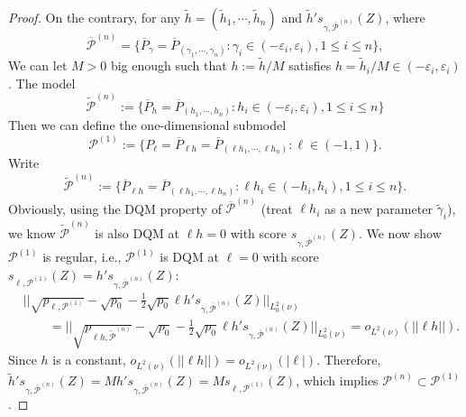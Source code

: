 \documentclass[12pt]{article}
\renewcommand{\(}{\left(}%
\renewcommand{\)}{\right)}%
\renewcommand{\[}{\left[}%
\renewcommand{\]}{\right]}%
\newcommand{\cp}{\mathcal{P}}
\newtheorem{proof}{Proof.}}
\begin{document}
\begin{proof}
	On the contrary, for any $\widetilde{h}=(\widetilde{h}_1,\cdots,\widetilde{h}_n)$ and $\widetilde{h}'s_{\gamma,\overline{\cp}^{(n)}}(Z)$, where
	\begin{equation*}
		\overline{\cp}^{(n)}=\{\overline{P}_{\gamma}=\overline{P}_{(\gamma_1,\cdots,\gamma_n)}:\gamma_i\in(-\varepsilon_i,\varepsilon_i),1\leq i\leq n\},
	\end{equation*}
	We can let $M>0$ big enough such that $h:=\widetilde{h}/M$ satisfies $h=\widetilde{h}_i/M\in (-\varepsilon_i,\varepsilon_i)$. The model
	\begin{equation*}
		\widetilde{\cp}^{(n)}:=\{\overline{P}_{h}=\overline{P}_{(h_1,\cdots,h_n)}:h_i\in(-\varepsilon_i,\varepsilon_i),1\leq i\leq n\}
	\end{equation*}
	Then
	we can define the one-dimensional submodel
	\begin{equation*}
		\cp^{(1)}:=\{P_\ell=\overline{P}_{\ell h}=\overline{P}_{(\ell h_1,\cdots,\ell h_n)}:\ell\in (-1,1)\}. 
	\end{equation*}
	Write 
	\begin{equation*}
		\widetilde{\cp}^{(n)}:=\{\overline{P}_{\ell h}=\overline{P}_{(\ell h_1,\cdots,\ell h_n)}:\ell h_i\in(-h_i,h_i),1\leq i\leq n\}.
	\end{equation*}
	Obviously, using the DQM property of $\overline{\cp}^{(n)}$ (treat $\ell  h_i$ as a new parameter $\tilde{\gamma}_i$), we know $\widetilde{\cp}^{(n)}$ is also DQM at $\ell h=0$ with score $ s_{\gamma,\overline{\cp}^{(n)}}(Z)$.
	We now show $\cp^{(1)}$ is regular, i.e., $\cp^{(1)}$ is DQM at $\ell=0$ with score $s_{\ell,\cp^{(1)}}(Z)=h's_{\gamma,\overline{\cp}^{(n)}}(Z)$:
	\begin{equation*}
		\begin{split}
			&||\sqrt{p_{\ell,\cp^{(1)}}}-\sqrt{p_0}-\frac{1}{2}\sqrt{p_0}\ell h's_{\gamma,\overline{\cp}^{(n)}}(Z)||_{L^2_0(\nu)}\\
			&\qquad = ||\sqrt{p_{\ell h,\widetilde{\cp}^{(n)}}}-\sqrt{p_0}-\frac{1}{2}\sqrt{p_0}\ell h's_{\gamma,\overline{\cp}^{(n)}}(Z)||_{L^2_0(\nu)}=o_{L^2(\nu)}(||\ell h||).
		\end{split}
	\end{equation*}
	Since $h$ is a constant, $o_{L^2(\nu)}(||\ell h||)=o_{L^2(\nu)}(|\ell|)$. Therefore, $\widetilde{h}'s_{\gamma,\overline{\cp}^{(n)}}(Z)=Mh's_{\gamma,\overline{\cp}^{(n)}}(Z)=Ms_{\ell,\cp^{(1)}}(Z)$, which implies $\cp^{(n)}\subset\cp^{(1)}$.
\end{proof}
\end{document}
